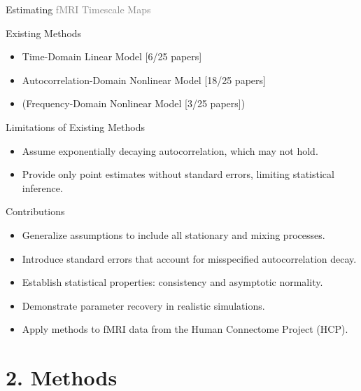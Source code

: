 \documentclass[8pt,aspectratio=169]{beamer}
\begin{document}
\begin{frame}{Estimating \textcolor{gray}{fMRI Timescale Maps}}

Existing Methods
\begin{itemize}
    \item Time-Domain Linear Model [6/25 papers]
    \item Autocorrelation-Domain Nonlinear Model [18/25 papers]
    \item (Frequency-Domain Nonlinear Model [3/25 papers])
\end{itemize}

\vfill
Limitations of Existing Methods
\begin{itemize}
    \item Assume exponentially decaying autocorrelation, which may not hold.
    \item Provide only point estimates without standard errors, limiting statistical inference.
\end{itemize}

\vfill
Contributions
\begin{itemize}
    \item Generalize assumptions to include all stationary and mixing processes.
    \item Introduce standard errors that account for misspecified autocorrelation decay.
    \item Establish statistical properties: consistency and asymptotic normality.
    \item Demonstrate parameter recovery in realistic simulations.
    \item Apply methods to fMRI data from the Human Connectome Project (HCP).
\end{itemize}

\end{frame}


\section{2. Methods}
\end{document}
